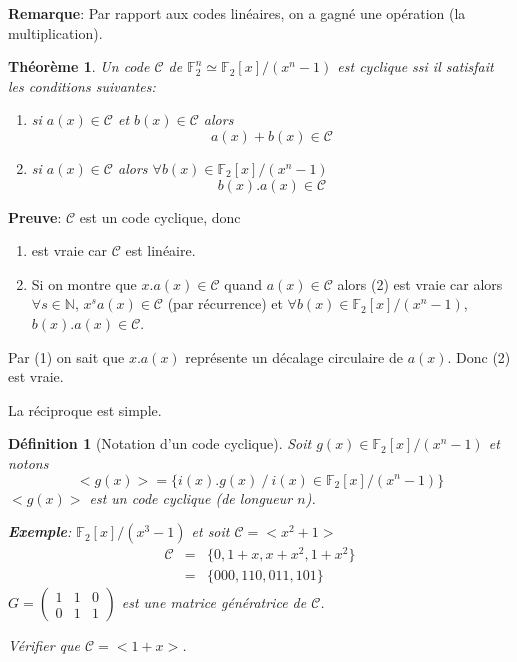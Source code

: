 \documentclass[a4paper,10pt,twocolumn]{article}
\theoremstyle{break}
\newcommand{\code}[1]{\mathcal{#1}}
\newcommand{\C}{\code{C}}
\newcommand{\F}{\mathbb{F}}
\newcommand{\FF}{\F_2}
\newcommand{\FFn}[1]{\FF^{#1}}
\newcommand{\cy}[1]{{<}#1{>}}
\newtheorem{mydef}{Définition}
\newtheorem{myth}{Théorème}
\newenvironment{note}[1]
{\textbf{#1}:}
{}
\newenvironment{myproof}
{\begin{note}{Preuve}}
{\end{note}}
\newenvironment{remarque}
{\begin{note}{Remarque}}
{\end{note}}
\newenvironment{exemple}
{\begin{note}{Exemple}}
{\end{note}}
\begin{document}
\begin{remarque}
 Par rapport aux codes linéaires, on a gagné une opération (la multiplication).
\end{remarque}

\begin{myth}
 Un code $\C$ de $\FFn{n} \simeq \FF[x] / (x^n-1)$ est cyclique ssi il satisfait les conditions suivantes:
 \begin{enumerate}
  \item si $a(x) \in \C$ et $b(x) \in \C$ alors
   $$ a(x) + b(x) \in \C $$
  \item si $a(x) \in \C$ alors $\forall b(x) \in \FF[x]/(x^n-1)$
   $$ b(x).a(x) \in \C $$
 \end{enumerate}
\end{myth}

\begin{myproof}
 $\C$ est un code cyclique, donc
 \begin{enumerate}
  \item est vraie car $\C$ est linéaire.
  \item Si on montre que $x.a(x) \in \C$ quand $a(x) \in \C$ alors (2) est vraie car alors $\forall s \in \mathbb{N}$,
   $x^s a(x) \in \C$ (par récurrence) et $\forall b(x) \in \FF[x]/(x^n-1)$, $b(x).a(x) \in \C$.
 \end{enumerate}
 Par (1) on sait que $x.a(x)$ représente un décalage circulaire de $a(x)$. Donc (2) est vraie.

 La réciproque est simple.
\end{myproof}

\begin{mydef}[Notation d'un code cyclique]
 Soit $g(x) \in \FF[x]/(x^n-1)$ et notons 
 $$\cy{g(x)} = \{ i(x).g(x)\ /\ i(x)\in\FF[x]/(x^n-1)\}$$
 $\cy{g(x)}$ est un code cyclique (de longueur $n$).
 
 \begin{exemple}
  $\FF[x]/(x^3-1)$ et soit $\C = \cy{x^2+1}$
  \begin{eqnarray*}
   \C & = & \{0, 1+x, x+x^2, 1+x^2\}\\
      & = & \{000, 110, 011, 101\}
  \end{eqnarray*}
  $G = \begin{pmatrix} 1 & 1 & 0 \\ 0 & 1 & 1 \end{pmatrix}$ est une matrice génératrice de $\C$.
  
  Vérifier que $\C = \cy{1+x}$.
 \end{exemple}
\end{mydef}
\end{document}
